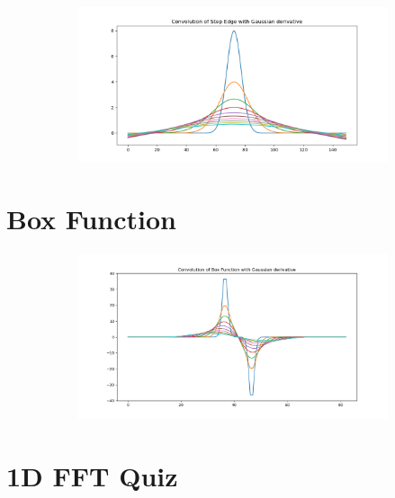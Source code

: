 \documentclass[12pt, oneside]{article}
\begin{document}
\begin{figure}[H]
    \centering
    \begin{subfigure}[b]{1\textwidth}
        \centering
        \includegraphics[width=\textwidth]{imgs/q3_plot.png}
    \end{subfigure}
    \caption{}
\end{figure}

\section{Box Function}


\begin{figure}[H]
    \centering
    \begin{subfigure}[b]{1\textwidth}
        \centering
        \includegraphics[width=\textwidth]{imgs/q4_plot.png}
    \end{subfigure}
    \caption{}
\end{figure}

\section{1D FFT Quiz}
\end{document}
